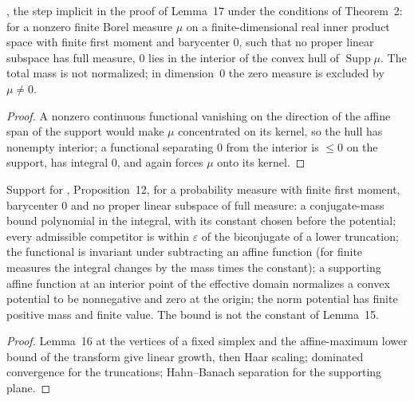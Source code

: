 \begin{lemma}
  \label{lem:cek-zero-interior}
  \leanok
  \cite{CorderoKlartag2015}, the step implicit in the proof of Lemma~17 under the conditions of Theorem~2: for a nonzero
  finite Borel measure $\mu$ on a finite-dimensional real inner product space with finite first moment and barycenter $0$,
  such that no proper linear subspace has full measure, $0$ lies in the interior of the convex hull of $\operatorname{Supp}\mu$.
  The total mass is not normalized; in dimension~$0$ the zero measure is excluded by $\mu\ne0$.
\end{lemma}
\begin{proof}
  \leanok
  A nonzero continuous functional vanishing on the direction of the affine span of the support would make $\mu$ concentrated
  on its kernel, so the hull has nonempty interior; a functional separating $0$ from the interior is $\le0$ on the support,
  has integral $0$, and again forces $\mu$ onto its kernel.
\end{proof}

\begin{lemma}
  \label{lem:cek-coercivity}
  \leanok
  Support for \cite{CorderoKlartag2015}, Proposition~12, for a probability measure with finite first moment, barycenter $0$
  and no proper linear subspace of full measure: a conjugate-mass bound polynomial in the integral, with its constant chosen
  before the potential; every admissible competitor is within $\varepsilon$ of the biconjugate of a lower truncation; the
  functional is invariant under subtracting an affine function (for finite measures the integral changes by the mass times
  the constant); a supporting affine function at an interior point of the effective domain normalizes a convex potential to
  be nonnegative and zero at the origin; the norm potential has finite positive mass and finite value.  The bound is not the
  constant of Lemma~15.
\end{lemma}
\begin{proof}
  \leanok
  Lemma~16 at the vertices of a fixed simplex and the affine-maximum lower bound of the transform give linear growth, then
  Haar scaling; dominated convergence for the truncations; Hahn--Banach separation for the supporting plane.
\end{proof}

